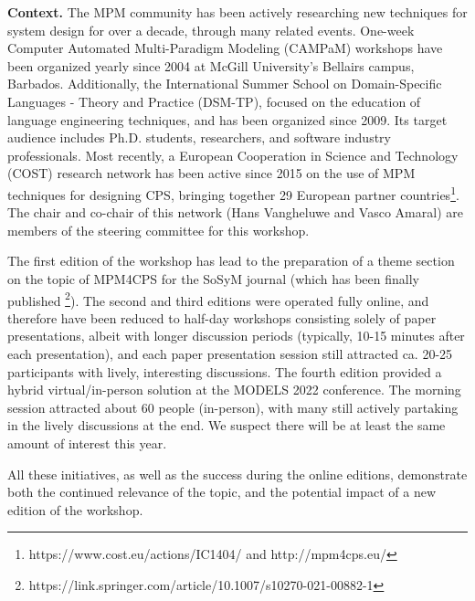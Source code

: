 \smallskip
\noindent
\textbf{Context.}
%
The MPM community has been actively researching new techniques for system design 
for over a decade, through many related events.
One-week Computer Automated Multi-Paradigm Modeling (CAMPaM) workshops have been 
organized yearly since 2004 at McGill University’s Bellairs campus, Barbados. 
Additionally, the International Summer School on Domain-Specific Languages - 
Theory and Practice (DSM-TP), focused on the education of language engineering 
techniques, and has been organized since 2009.
Its target audience includes Ph.D. students, researchers, and software industry 
professionals.
Most recently, a European Cooperation in Science and Technology (COST) research 
network has been active since 2015 on the use of MPM techniques for designing 
CPS, bringing together 29 European partner countries\footnote{https://www.cost.eu/actions/IC1404/ 
and http://mpm4cps.eu/}.
The chair and co-chair of this network (Hans Vangheluwe and Vasco Amaral) are 
members of the steering committee for this workshop.

The first edition of the workshop has lead to the preparation of a theme section
on the topic of MPM4CPS for the SoSyM journal (which has been finally published%
\footnote{ https://link.springer.com/article/10.1007/s10270-021-00882-1}).
The second and third editions were operated fully online, and therefore have been
reduced to half-day workshops consisting solely of paper presentations, albeit with
longer discussion periods (typically, 10-15 minutes after each presentation), and
each paper presentation session still attracted ca. 20-25 participants with lively,
interesting discussions. The fourth edition provided a hybrid virtual/in-person solution at the MODELS 2022 conference. The morning session attracted about 60 people (in-person), with many still actively partaking in the lively discussions at the end. We suspect there will be at least the same amount of interest this year.

All these initiatives, as well as the success during the online editions, 
demonstrate both the continued relevance of the topic, and the 
potential impact of a new edition of the workshop.





